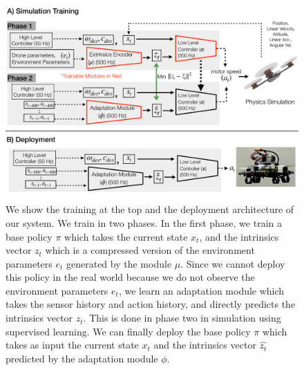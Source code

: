 \begin{figure}
\centering
\includegraphics[width=\linewidth]{img/method-figures-no-last-act.pdf}
\caption{\small We show the training at the top and the deployment architecture of our system. We train in two phases. In the first phase, we train a base policy $\pi$ which takes the current state $x_t$, and the intrinsics vector $z_t$ which is a compressed version of the environment parameters $e_t$ generated by the module $\mu$. Since we cannot deploy this policy in the real world because we do not observe the environment parameters $e_t$, we learn an adaptation module which takes the sensor history and action history, and directly predicts the intrinsics vector $z_t$. This is done in phase two in simulation using supervised learning. We can finally deploy the base policy $\pi$ which takes as input the current state $x_t$ and the intrinsics vector $\hat{z_t}$ predicted by the adaptation module $\phi$.}
\label{fig:method}
\end{figure}

